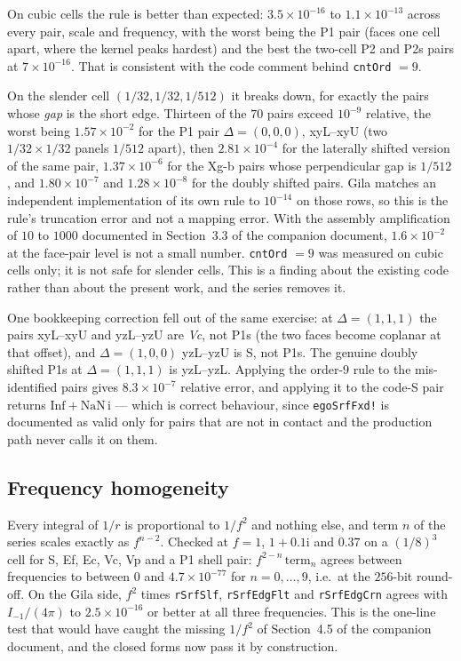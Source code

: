 \documentclass[11pt]{article}
\theoremstyle{remark}
\newcommand{\ii}{\mathrm{i}}
\newcommand{\code}[1]{\texttt{#1}}
\begin{document}
On cubic cells the rule is better than expected: $3.5\times10^{-16}$ to $1.1\times10^{-13}$
across every pair, scale and frequency, with the worst being the P1 pair (faces one cell
apart, where the kernel peaks hardest) and the best the two-cell P2 and P2s pairs at
$7\times10^{-16}$. That is consistent with the code comment behind \code{cntOrd} $= 9$.

On the slender cell $(1/32,1/32,1/512)$ it breaks down, for exactly the pairs whose
\emph{gap} is the short edge. Thirteen of the $70$ pairs exceed $10^{-9}$ relative, the
worst being $1.57\times10^{-2}$ for the P1 pair $\Delta = (0,0,0)$, xyL--xyU (two
$1/32\times1/32$ panels $1/512$ apart), then $2.81\times10^{-4}$ for the laterally shifted
version of the same pair, $1.37\times10^{-6}$ for the Xg-b pairs whose perpendicular gap is
$1/512$, and $1.80\times10^{-7}$ and $1.28\times10^{-8}$ for the doubly shifted pairs. Gila
matches an independent implementation of its own rule to $10^{-14}$ on those rows, so this
is the rule's truncation error and not a mapping error. With the assembly amplification of
$10$ to $1000$ documented in Section~3.3 of the companion document, $1.6\times10^{-2}$ at
the face-pair level is not a small number. \code{cntOrd} $= 9$ was measured on cubic cells
only; it is not safe for slender cells. This is a finding about the existing code rather
than about the present work, and the series removes it.

One bookkeeping correction fell out of the same exercise: at $\Delta = (1,1,1)$ the pairs
xyL--xyU and yzL--yzU are \emph{Vc}, not P1s (the two faces become coplanar at that
offset), and $\Delta = (1,0,0)$ yzL--yzU is S, not P1s. The genuine doubly shifted P1s at
$\Delta = (1,1,1)$ is yzL--yzL. Applying the order-$9$ rule to the mis-identified pairs
gives $8.3\times10^{-7}$ relative error, and applying it to the code-S pair returns
$\mathrm{Inf} + \mathrm{NaN}\,\ii$ --- which is correct behaviour, since \code{egoSrfFxd!}
is documented as valid only for pairs that are not in contact and the production path never
calls it on them.

\subsection{Frequency homogeneity}

Every integral of $1/r$ is proportional to $1/f^2$ and nothing else, and term $n$ of the
series scales exactly as $f^{n-2}$. Checked at $f = 1$, $1+0.1\ii$ and $0.37$ on a
$(1/8)^3$ cell for S, Ef, Ec, Vc, Vp and a P1 shell pair: $f^{2-n}\,\mathrm{term}_n$ agrees
between frequencies to between $0$ and $4.7\times10^{-77}$ for $n = 0,\ldots,9$, i.e.\ at
the $256$-bit round-off. On the Gila side, $f^2$ times \code{rSrfSlf}, \code{rSrfEdgFlt}
and \code{rSrfEdgCrn} agrees with $I_{-1}/(4\pi)$ to $2.5\times10^{-16}$ or better at all
three frequencies. This is the one-line test that would have caught the missing $1/f^2$
of Section~4.5 of the companion document, and the closed forms now pass it by construction.
\end{document}
